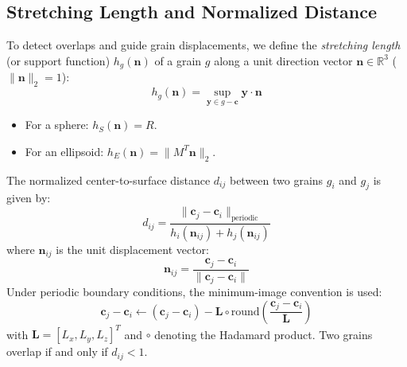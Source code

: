 \documentclass[preprint,12pt]{elsarticle}
\newcommand{\R}{\mathbb{R}}
\newcommand{\n}{\mathbf{n}}
\newcommand{\y}{\mathbf{y}}
\newcommand{\cvec}{\mathbf{c}}
\begin{document}
\subsection{Stretching Length and Normalized Distance}
To detect overlaps and guide grain displacements, we define the \textit{stretching length} (or support function) $h_g(\n)$ of a grain $g$ along a unit direction vector $\n \in \R^3$ ($\|\n\|_2 = 1$):
\begin{equation}
\label{eq:stretching_length}
h_g(\n) = \sup_{\y \in g - \cvec} \y \cdot \n
\end{equation}
\begin{itemize}
    \item For a sphere: $h_S(\n) = R$.
    \item For an ellipsoid: $h_E(\n) = \| M^T \n \|_2$.
\end{itemize}
The normalized center-to-surface distance $d_{ij}$ between two grains $g_i$ and $g_j$ is given by:
\begin{equation}
\label{eq:norm_distance}
d_{ij} = \frac{\| \cvec_j - \cvec_i \|_{\text{periodic}}}{h_i(\n_{ij}) + h_j(\n_{ij})}
\end{equation}
where $\n_{ij}$ is the unit displacement vector:
\begin{equation}
\n_{ij} = \frac{\cvec_j - \cvec_i}{\|\cvec_j - \cvec_i\|}
\end{equation}
Under periodic boundary conditions, the minimum-image convention is used:
\begin{equation}
\cvec_j - \cvec_i \leftarrow (\cvec_j - \cvec_i) - \mathbf{L} \circ \text{round}\left( \frac{\cvec_j - \cvec_i}{\mathbf{L}} \right)
\end{equation}
with $\mathbf{L} = [L_x, L_y, L_z]^T$ and $\circ$ denoting the Hadamard product. Two grains overlap if and only if $d_{ij} < 1$.
\end{document}
